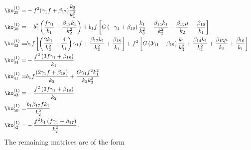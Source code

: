 \begin{align}
 \\ \ko^{(1)}_{25}=& -f^2(\gamma_1f+\beta_{17})\frac{k_{2} }{k_{1}^{2}}
 \\ \ko^{(1)}_{30}=& - b_{1}^{2}\left(\frac{f \gamma_{1}}{k_{1}}+\frac{\beta_{17} k_{1} }{k_{2}^{2}}\right)+b_{1}f\left[G\left(- \gamma_{1}+\beta_{19}\right)  \frac{k_{1} }{k_{3}^{2}}-\frac{\beta_{14} k_{1}}{k_{2}^{2}}-\frac{\beta_{15} \mu}{k_{2}}-\frac{\beta_{16}}{k_{1}}\right] 
 \\ \ko^{(1)}_{32}=& b_{1}f\left[\left(\frac{2 k_{1}}{k_{2}^{2}}+\frac{4}{k_{1}}\right) \gamma_{1} f+\frac{ \beta_{17} k_{1}}{k_{2}^{2}}+\frac{\beta_{18}}{k_{1}}\right] +f^2\left[G\left(3 \gamma_{1}- \beta_{19}\right) \frac{k_{1} }{k_{3}^{2}}+\frac{\beta_{14} k_{1}}{k_{2}^{2}}+\frac{\beta_{15} \mu}{k_{2}}+\frac{\beta_{16}}{k_{1}}\right]
 \\ \ko^{(1)}_{34}=& -\frac{f^{2}\left(3 f \gamma_{1}+\beta_{18}\right)}{k_{1}}
 \\ \ko^{(1)}_{41}=& b_{1}f\frac{\left(2 \gamma_{1} f+ \beta_{18}\right)}{k_{2}} +\frac{G \gamma_{1} f^{2} k_{1}^{2} }{k_{2} k_{3}^{2}}
 \\ \ko^{(1)}_{43}=&-\frac{f^{2}\left(3 f \gamma_{1}+\beta_{18}\right)}{k_{2}}
 \\ \ko^{(1)}_{50}=& \frac{b_1 \beta_{17} f k_1}{k_2^2}
 \\ \ko^{(1)}_{52}=&-\frac{f^{2} k_{1}\left(f \gamma_{1}+\beta_{17}\right)}{k_{2}^{2}}\,.
\end{align}
The remaining matrices are of the form 
